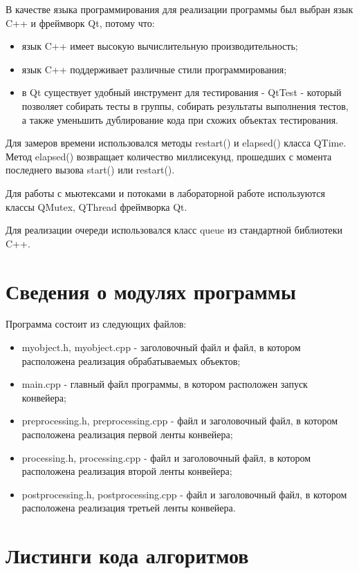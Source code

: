 \documentclass[a4paper,14pt]{report}
\begin{document}
В качестве языка программирования для реализации программы был выбран язык C++ и фреймворк Qt, потому что:
\begin{itemize}
	\item язык C++ имеет высокую вычислительную производительность;
	\item язык C++ поддерживает различные стили программирования;
	\item в Qt существует удобный инструмент для тестирования - QtTest - который позволяет собирать тесты в группы, собирать результаты выполнения тестов, а также уменьшить дублирование кода при схожих объектах тестирования.
\end{itemize}

Для замеров времени использовался методы restart() и elapsed() класса QTime. Метод elapsed() возвращает количество миллисекунд, прошедших с момента последнего вызова start() или restart().

Для работы с мьютексами и потоками в лабораторной работе используются классы QMutex, QThread фреймворка Qt.

Для реализации очереди использовался класс queue из стандартной библиотеки C++.

\section*{Сведения о модулях программы}

Программа состоит из следующих файлов:
\begin{itemize}
	\item myobject.h, myobject.cpp - заголовочный файл и файл, в котором расположена реализация обрабатываемых объектов;
	\item main.cpp - главный файл программы, в котором расположен запуск конвейера;
	\item preprocessing.h, preprocessing.cpp - файл и заголовочный файл, в котором расположена реализация первой ленты конвейера;
	\item processing.h, processing.cpp - файл и заголовочный файл, в котором расположена реализация второй ленты конвейера;
	\item postprocessing.h, postprocessing.cpp - файл и заголовочный файл, в котором расположена реализация третьей ленты конвейера.
\end{itemize}

\section*{Листинги кода алгоритмов}
\end{document}
